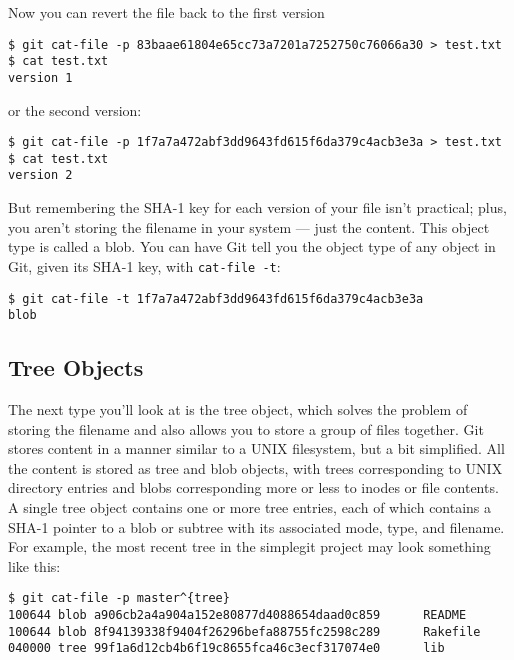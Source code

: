 \documentclass[a4paper]{book}
\begin{document}
Now you can revert the file back to the first version

\begin{shaded}\begin{verbatim}
$ git cat-file -p 83baae61804e65cc73a7201a7252750c76066a30 > test.txt
$ cat test.txt
version 1
\end{verbatim}\end{shaded}

or the second version:

\begin{shaded}\begin{verbatim}
$ git cat-file -p 1f7a7a472abf3dd9643fd615f6da379c4acb3e3a > test.txt
$ cat test.txt
version 2
\end{verbatim}\end{shaded}

But remembering the SHA-1 key for each version of your file isn't practical; plus, you aren't storing the filename in your system --- just the content. This object type is called a blob. You can have Git tell you the object type of any object in Git, given its SHA-1 key, with \texttt{cat-file -t}:

\begin{shaded}\begin{verbatim}
$ git cat-file -t 1f7a7a472abf3dd9643fd615f6da379c4acb3e3a
blob
\end{verbatim}\end{shaded}

\subsection{Tree Objects}\label{tree-objects}

The next type you'll look at is the tree object, which solves the problem of storing the filename and also allows you to store a group of files together. Git stores content in a manner similar to a UNIX filesystem, but a bit simplified. All the content is stored as tree and blob objects, with trees corresponding to UNIX directory entries and blobs corresponding more or less to inodes or file contents. A single tree object contains one or more tree entries, each of which contains a SHA-1 pointer to a blob or subtree with its associated mode, type, and filename. For example, the most recent tree in the simplegit project may look something like this:

\begin{shaded}\begin{verbatim}
$ git cat-file -p master^{tree}
100644 blob a906cb2a4a904a152e80877d4088654daad0c859      README
100644 blob 8f94139338f9404f26296befa88755fc2598c289      Rakefile
040000 tree 99f1a6d12cb4b6f19c8655fca46c3ecf317074e0      lib
\end{verbatim}\end{shaded}
\end{document}
